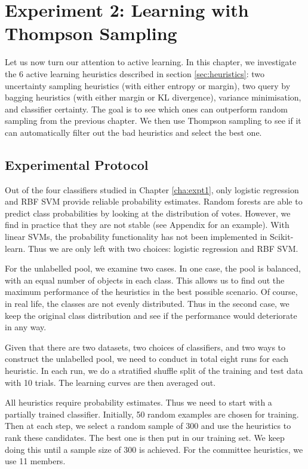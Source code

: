 

\chapter{Experiment 2: Learning with Thompson Sampling}
\label{cha:expt2}

Let us now turn our attention to active learning. In this chapter,
we investigate the 6 active learning heuristics described in section \ref{sec:heuristics}:
two uncertainty sampling heuristics (with either entropy or margin), two query
by bagging heuristics (with either margin or KL divergence), variance minimisation,
and classifier certainty. The goal is to see which ones can outperform
random sampling from the previous chapter. We then use Thompson sampling to see if
it can automatically filter out the bad heuristics and select the best one.


\section{Experimental Protocol}
\label{sec:protocol2}

Out of the four classifiers studied in Chapter \ref{cha:expt1}, only logistic regression
and RBF SVM provide reliable probability estimates. Random forests are able to predict
class probabilities by looking at the distribution of votes. However, we find in practice
that they are not stable (see Appendix for an example). With linear SVMs, the probability 
functionality has not been implemented in Scikit-learn. Thus we are only left
with two choices: logistic regression and RBF SVM.

For the unlabelled pool, we examine two cases. In one case, the pool is balanced, with
an equal number of objects in each class. This allows us to find out the maximum
performance of the heuristics in the best possible scenario. Of course, in real life,
the classes are not evenly distributed. Thus in the second case, we keep the original
class distribution and see if the performance would deteriorate in any way.

Given that there are two datasets, two choices of classifiers, and two ways to construct the
unlabelled pool, we need to conduct in total eight runs for each heuristic.
In each run, we do a stratified shuffle split of the training and test data with 10 trials.
The learning curves are then averaged out.

All heuristics require probability estimates. Thus we need to start with a partially trained
classifier. Initially, 50 random examples are chosen for training. Then at each step,
we select a random sample of 300 and use the heuristics to rank these candidates. The best
one is then put in our training
set. We keep doing this until a sample size of 300 is achieved. For the committee heuristics,
we use 11 members.

